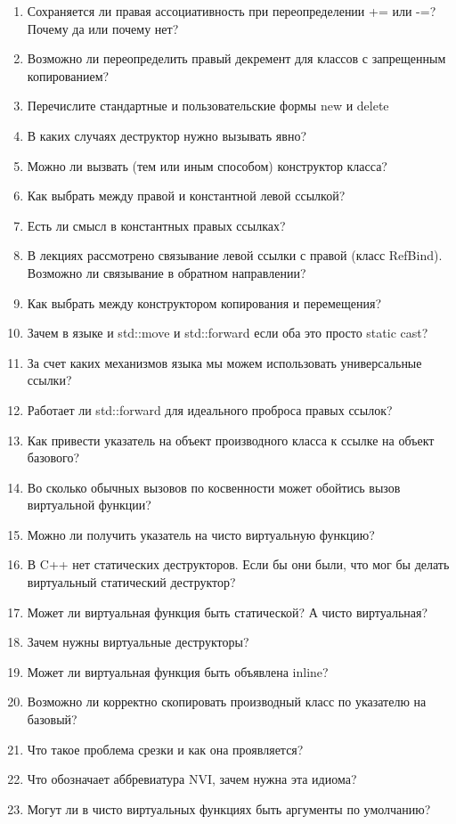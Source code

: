 \documentclass[a4paper,12pt,oneside]{article}
\begin{document}
\begin{enumerate}
\item Сохраняется ли правая ассоциативность при переопределении += или -=? Почему да или почему нет?
\item Возможно ли переопределить правый декремент для классов с запрещенным копированием?
\item Перечислите стандартные и пользовательские формы new и delete
\item В каких случаях деструктор нужно вызывать явно?
\item Можно ли вызвать (тем или иным способом) конструктор класса?
\item Как выбрать между правой и константной левой ссылкой?
\item Есть ли смысл в константных правых ссылках?
\item В лекциях рассмотрено связывание левой ссылки с правой (класс RefBind). Возможно ли связывание в обратном направлении?
\item Как выбрать между конструктором копирования и перемещения?
\item Зачем в языке и std::move и std::forward если оба это просто static cast?
\item За счет каких механизмов языка мы можем использовать универсальные ссылки?
\item Работает ли std::forward для идеального проброса правых ссылок?
\item Как привести указатель на объект производного класса к ссылке на объект базового?
\item Во сколько обычных вызовов по косвенности может обойтись вызов виртуальной функции?
\item Можно ли получить указатель на чисто виртуальную функцию?
\item В C++ нет статических деструкторов. Если бы они были, что мог бы делать виртуальный статический деструктор?
\item Может ли виртуальная функция быть статической? А чисто виртуальная?
\item Зачем нужны виртуальные деструкторы?
\item Может ли виртуальная функция быть объявлена inline?
\item Возможно ли корректно скопировать производный класс по указателю на базовый?
\item Что такое проблема срезки и как она проявляется?
\item Что обозначает аббревиатура NVI, зачем нужна эта идиома?
\item Могут ли в чисто виртуальных функциях быть аргументы по умолчанию?

\end{enumerate}
\end{document}
